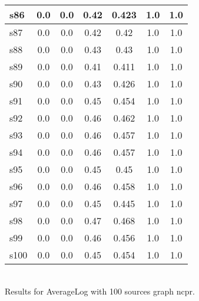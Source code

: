 \documentclass{article}
\begin{document}
\begin{tabular}{|l|c|c|c|c|c|c|}
\hline
s86 &0.0 & 0.0 & 0.42 & 0.423 & 1.0 & 1.0\\
\hline
s87 &0.0 & 0.0 & 0.42 & 0.42 & 1.0 & 1.0\\
\hline
s88 &0.0 & 0.0 & 0.43 & 0.43 & 1.0 & 1.0\\
\hline
s89 &0.0 & 0.0 & 0.41 & 0.411 & 1.0 & 1.0\\
\hline
s90 &0.0 & 0.0 & 0.43 & 0.426 & 1.0 & 1.0\\
\hline
s91 &0.0 & 0.0 & 0.45 & 0.454 & 1.0 & 1.0\\
\hline
s92 &0.0 & 0.0 & 0.46 & 0.462 & 1.0 & 1.0\\
\hline
s93 &0.0 & 0.0 & 0.46 & 0.457 & 1.0 & 1.0\\
\hline
s94 &0.0 & 0.0 & 0.46 & 0.457 & 1.0 & 1.0\\
\hline
s95 &0.0 & 0.0 & 0.45 & 0.45 & 1.0 & 1.0\\
\hline
s96 &0.0 & 0.0 & 0.46 & 0.458 & 1.0 & 1.0\\
\hline
s97 &0.0 & 0.0 & 0.45 & 0.445 & 1.0 & 1.0\\
\hline
s98 &0.0 & 0.0 & 0.47 & 0.468 & 1.0 & 1.0\\
\hline
s99 &0.0 & 0.0 & 0.46 & 0.456 & 1.0 & 1.0\\
\hline
s100 &0.0 & 0.0 & 0.45 & 0.454 & 1.0 & 1.0\\
\hline
\end{tabular}\\

\noindent Results for AverageLog with 100 sources graph ncpr.
\end{document}
